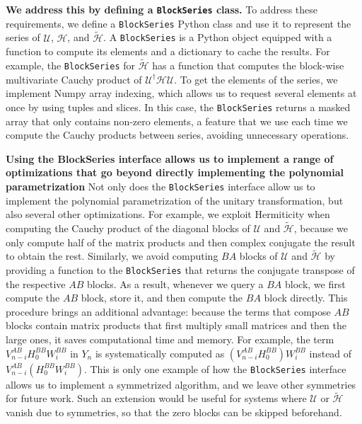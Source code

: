 \documentclass[submission, Codebases]{SciPost}
\begin{document}
{{\textbf{We address this by defining a \texttt{BlockSeries} class.}
To address these requirements, we define a \texttt{BlockSeries} Python class and use
it to represent the series of $\mathcal{U}$, $\mathcal{H}$, and
$\tilde{\mathcal{H}}$.
A \texttt{BlockSeries} is a Python object equipped with a function to compute its
elements and a dictionary to cache the results.
For example, the \texttt{BlockSeries} for $\tilde{\mathcal{H}}$ has a function that
computes the block-wise multivariate Cauchy product of $\mathcal{U}^{\dagger}
\mathcal{H} \mathcal{U}$.
To get the elements of the series, we implement Numpy array indexing,
which allows us to request several elements at once by using tuples and slices.
In this case, the \texttt{BlockSeries} returns a masked array that only contains
non-zero elements, a feature that we use each time we compute the Cauchy
products between series, avoiding unnecessary operations.

\textbf{Using the BlockSeries interface allows us to implement a range of
optimizations that go beyond directly implementing the polynomial
parametrization}
Not only does the \texttt{BlockSeries} interface allow us to implement the polynomial
parametrization of the unitary transformation, but also several other
optimizations.
For example, we exploit Hermiticity when computing the Cauchy product of the
diagonal blocks of $\mathcal{U}$ and $\tilde{\mathcal{H}}$, because we only
compute half of the matrix products and then complex conjugate the result to
obtain the rest.
Similarly, we avoid computing $BA$ blocks of $\mathcal{U}$ and
$\tilde{\mathcal{H}}$ by providing a function to the \texttt{BlockSeries} that returns
the conjugate transpose of the respective $AB$ blocks.
As a result, whenever we query a $BA$ block, we first compute the $AB$ block,
store it, and then compute the $BA$ block directly.
This procedure brings an additional advantage: because the terms that compose
$AB$ blocks contain matrix products that first multiply small matrices and then
the large ones, it saves computational time and memory.
For example, the term $V_{n -i}^{AB} H_0^{BB}
W_i^{BB}$ in $Y_n$ is systematically computed as $(V_{n -i}^{AB}
H_0^{BB}) W_i^{BB}$ instead of $V_{n -i}^{AB}
(H_0^{BB} W_i^{BB})$.
This is only one example of how the \texttt{BlockSeries} interface allows us to
implement a symmetrized algorithm, and we leave other symmetries for future
work.
Such an extension would be useful for systems where $\mathcal{U}$ or
$\tilde{\mathcal{H}}$ vanish due to symmetries, so that the zero blocks can be
skipped beforehand.

}}
\end{document}
